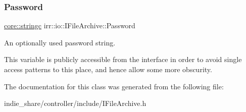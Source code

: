 \subsubsection{\texorpdfstring{Password}{Password}}
{\footnotesize\ttfamily \hyperlink{namespaceirr_1_1core_ab26a0e0359206b5a694f35c37c829d7f}{core\+::stringc} irr\+::io\+::\+I\+File\+Archive\+::\+Password}



An optionally used password string. 

This variable is publicly accessible from the interface in order to avoid single access patterns to this place, and hence allow some more obscurity. 

The documentation for this class was generated from the following file\+:\begin{DoxyCompactItemize}
\item 
indie\+\_\+share/controller/include/I\+File\+Archive.\+h\end{DoxyCompactItemize}
